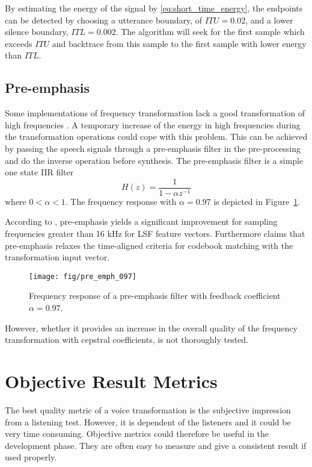 By estimating the energy of the signal by \eqref{eq:short_time_energy}, the endpoints can be detected by choosing a utterance boundary, of \eg $ITU=0.02$, and a lower silence boundary, \eg $ITL=0.002$. The algorithm will seek for the first sample which exceeds $ITU$ and backtrace from this sample to the first sample with lower energy than $ITL$.



\subsection{Pre-emphasis} %
\label{sub:pre_emphasis}
Some implementations of frequency transformation lack a good transformation of high frequencies \cite{turk06}. A temporary increase of the energy in high frequencies during the transformation operations could cope with this problem. This can be achieved by passing the speech signals through a pre-emphasis filter in the pre-processing and do the inverse operation before synthesis. The pre-emphasis filter is a simple one state IIR filter
\begin{equation}
	\label{eq:pre_emphasis}
	H(z) = \frac{1}{1-\alpha z^{-1}}
\end{equation}
where $0<\alpha < 1$. The frequency response with $\alpha=0.97$ is depicted in Figure~\ref{fig:pre_emph_097}.

According to \cite{turk06}, pre-emphasis yields a significant improvement for sampling frequencies greater than 16 kHz for LSF feature vectors. Furthermore \cite{turk06} claims that pre-emphasis relaxes the time-aligned criteria for codebook matching with the transformation input vector. 
\begin{figure}[htbp]
	\begin{center}
		\texttt{[image: fig/pre\_emph\_097]}
		\caption{Frequency response of a pre-emphasis filter with 
		feedback coefficient $\alpha=0.97$.}
		\label{fig:pre_emph_097}
	\end{center}
\end{figure}
However, whether it provides an increase in the overall quality of the frequency transformation with cepstral coefficients, is not thoroughly tested.


\section{Objective Result Metrics} %
\label{sec:objective_metrics}
The best quality metric of a voice transformation is the subjective impression from a listening test. However, it is dependent of the listeners and it could be very time consuming. Objective metrics could therefore be useful in the development phase. They are often easy to measure and give a consistent result if used properly. 


